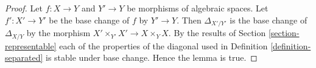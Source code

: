 \documentclass[10pt,a4paper]{amsart}
\theoremstyle{plain}
\theoremstyle{definition}
\theoremstyle{remark}
\numberwithin{equation}{subsection}
\begin{document}
\begin{proof}
Let $f : X \to Y$ and $Y' \to Y$ be morphisms of algebraic spaces.
Let $f' : X' \to Y'$ be the base change of $f$ by $Y' \to Y$. Then
$\Delta_{X'/Y'}$ is the base change of $\Delta_{X/Y}$ by
the morphism $X' \times_{Y'} X' \to X \times_Y X$. By the results of
Section \ref{section-representable}
each of the properties of the diagonal used in
Definition \ref{definition-separated}
is stable under base change. Hence the lemma is true.
\end{proof}
\end{document}
